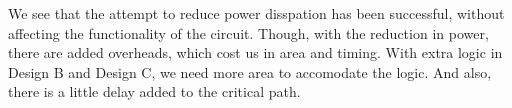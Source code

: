 \documentclass[11pt,a4paper]{article}
\begin{document}
We see that the attempt to reduce power disspation has been successful, without affecting the functionality of the circuit. Though, with the reduction in power, there are added overheads, which cost us in area and timing. With extra logic in Design B and Design C, we need more area to accomodate the logic. And also, there is a little delay added to the critical path.






\end{document}
